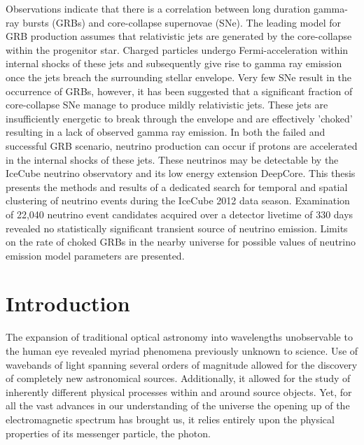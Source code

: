 \documentclass{gatech-thesis}
\begin{document}
\begin{preliminary}
\begin{summary}
Observations indicate that there is a correlation between long duration gamma-ray bursts (GRBs) and core-collapse supernovae (SNe).  The leading model for GRB production assumes that relativistic jets are generated by the core-collapse within the progenitor star.  Charged particles undergo Fermi-acceleration within internal shocks of these jets and subsequently give rise to gamma ray emission once the jets breach the surrounding stellar envelope.  Very few SNe result in the occurrence of GRBs, however, it has been suggested that a significant fraction of core-collapse SNe manage to produce mildly relativistic jets.  These jets are insufficiently energetic to break through the envelope and are effectively 'choked' resulting in a lack of observed gamma ray emission.  In both the failed and successful GRB scenario, neutrino production can occur if protons are accelerated in the internal shocks of these jets.  These neutrinos may be detectable by the IceCube neutrino observatory and its low energy extension DeepCore. This thesis presents the methods and results of a dedicated search for temporal and spatial clustering of neutrino events during the IceCube 2012 data season. Examination of 22,040 neutrino event candidates acquired over a detector livetime of 330 days revealed no statistically significant transient source of neutrino emission. Limits on the rate of choked GRBs in the nearby universe for possible values of neutrino emission model parameters are presented.


\end{summary}

\end{preliminary}
\chapter{Introduction}
The expansion of traditional optical astronomy into wavelengths unobservable to the human eye revealed myriad phenomena previously unknown to science. Use of wavebands of light spanning several orders of magnitude allowed for the discovery of completely new astronomical sources. Additionally, it allowed for the study of inherently different physical processes within and around source objects. Yet, for all the vast advances in our understanding of the universe the opening up of the electromagnetic spectrum has brought us, it relies entirely upon the physical properties of its messenger particle, the photon.
\end{document}

